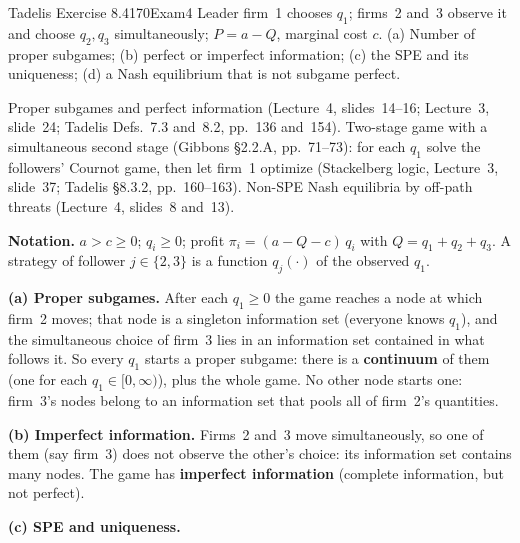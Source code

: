 \begin{exsol}{Tadelis Exercise 8.4}{170}{Exam}{4}
\asked Leader firm~1 chooses $q_1$; firms~2 and~3 observe it and choose $q_2, q_3$ simultaneously;
$P = a - Q$, marginal cost $c$. (a) Number of proper subgames; (b) perfect or imperfect
information; (c) the SPE and its uniqueness; (d) a Nash equilibrium that is not subgame perfect.

\method Proper subgames and perfect information (Lecture~4, slides~14--16; Lecture~3, slide~24;
Tadelis Defs.~7.3 and~8.2, pp.~136 and~154). Two-stage game with a simultaneous second stage
(Gibbons \S2.2.A, pp.~71--73): for each $q_1$ solve the followers' Cournot game, then let firm~1
optimize (Stackelberg logic, Lecture~3, slide~37; Tadelis \S8.3.2, pp.~160--163). Non-SPE Nash
equilibria by off-path threats (Lecture~4, slides~8 and~13).

\solution
\textbf{Notation.} $a > c \ge 0$; $q_i \ge 0$; profit $\pi_i = (a - Q - c)\,q_i$ with
$Q = q_1 + q_2 + q_3$. A strategy of follower $j \in \{2,3\}$ is a function $q_j(\cdot)$ of the
observed $q_1$.

\textbf{(a) Proper subgames.} After each $q_1 \ge 0$ the game reaches a node at which firm~2 moves;
that node is a singleton information set (everyone knows $q_1$), and the simultaneous choice of firm~3
lies in an information set contained in what follows it. So every $q_1$ starts a proper subgame: there
is a \textbf{continuum} of them (one for each $q_1 \in [0, \infty)$), plus the whole game. No other node
starts one: firm~3's nodes belong to an information set that pools all of firm~2's quantities.

\textbf{(b) Imperfect information.} Firms~2 and~3 move simultaneously, so one of them (say firm~3)
does not observe the other's choice: its information set contains many nodes. The game has
\textbf{imperfect information} (complete information, but not perfect).

\textbf{(c) SPE and uniqueness.}


\end{exsol}
